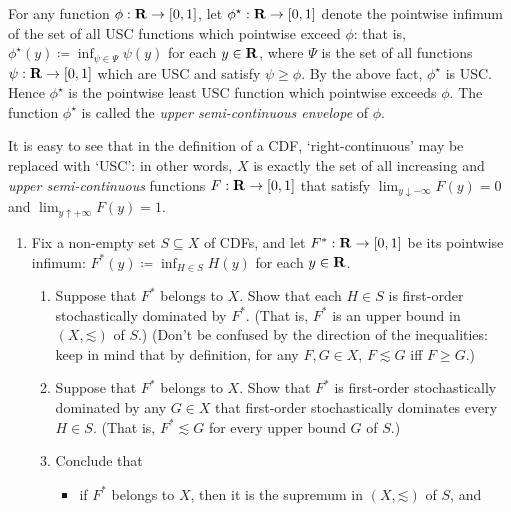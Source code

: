 \begin{exercise}
	For any function $\phi : \mathbf{R} \to [0,1]$, let $\phi^\star : \mathbf{R} \to [0,1]$ denote the pointwise infimum of the set of all USC functions which pointwise exceed $\phi$: that is, $\phi^\star(y) \coloneqq \inf_{\psi \in \Psi} \psi(y)$ for each $y \in \mathbf{R}$, where $\Psi$ is the set of all functions $\psi : \mathbf{R} \to [0,1]$ which are USC and satisfy $\psi \geq \phi$. By the above fact, $\phi^\star$ is USC. Hence $\phi^\star$ is the pointwise least USC function which pointwise exceeds $\phi$. The function $\phi^\star$ is called the \emph{upper semi-continuous envelope} of $\phi$.

	It is easy to see that in the definition of a CDF, `right-continuous' may be replaced with `USC': in other words, $X$ is exactly the set of all increasing and \emph{upper semi-continuous} functions $F : \mathbf{R} \to [0,1]$ that satisfy $\lim_{y \downarrow -\infty} F(y) = 0$ and $\lim_{y \uparrow +\infty} F(y) = 1$.

	\begin{enumerate}[label=(\alph*),resume]
	
		\item \label{item:exercise:CDFs_lattice:b} Fix a non-empty set $S \subseteq X$ of CDFs, and let $F^* : \mathbf{R} \to [0,1]$ be its pointwise infimum: $F^*(y) \coloneqq \inf_{H \in S} H(y)$ for each $y \in \mathbf{R}$. 

		\begin{enumerate}[label=(\roman*)]
		
			\item Suppose that $F^*$ belongs to $X$.
			Show that each $H \in S$ is first-order stochastically dominated by $F^*$. (That is, $F^*$ is an upper bound in $(X,\mathord{\lesssim})$ of $S$.) (Don't be confused by the direction of the inequalities: keep in mind that by definition, for any $F,G \in X$, $F \lesssim G$ iff $F \geq G$.)

			\item Suppose that $F^*$ belongs to $X$.
			Show that $F^*$ is first-order stochas\-tically dominated by any $G \in X$ that first-order stochastically dominates every $H \in S$.
			(That is, $F^* \lesssim G$ for every upper bound $G$ of $S$.)

			\item Conclude that

			\begin{itemize}
			
				\item if $F^*$ belongs to $X$, then it is the supremum in $(X,\mathord{\lesssim})$ of $S$, and


\end{itemize}
\end{enumerate}
\end{enumerate}
\end{exercise}
